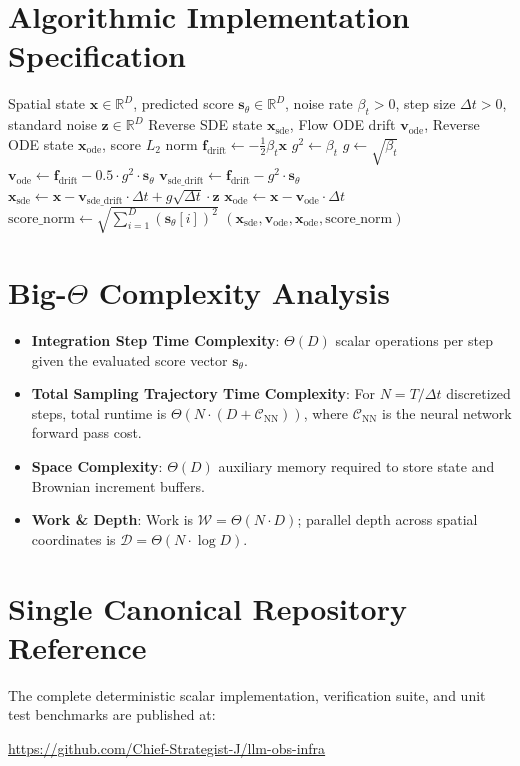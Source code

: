 \documentclass[11pt,a4paper]{article}
\theoremstyle{definition}
\begin{document}
\section{Algorithmic Implementation Specification}

\begin{algorithm}[H]
\caption{Continuous Score-Based Reverse SDE and Flow ODE Integration}
\begin{algorithmic}[1]
\Require Spatial state $\mathbf{x} \in \mathbb{R}^D$, predicted score $\mathbf{s}_\theta \in \mathbb{R}^D$, noise rate $\beta_t > 0$, step size $\Delta t > 0$, standard noise $\mathbf{z} \in \mathbb{R}^D$
\Ensure Reverse SDE state $\mathbf{x}_{\text{sde}}$, Flow ODE drift $\mathbf{v}_{\text{ode}}$, Reverse ODE state $\mathbf{x}_{\text{ode}}$, score $L_2$ norm
\State $\mathbf{f}_{\text{drift}} \gets -\frac{1}{2} \beta_t \mathbf{x}$
\State $g^2 \gets \beta_t$
\State $g \gets \sqrt{\beta_t}$
\State $\mathbf{v}_{\text{ode}} \gets \mathbf{f}_{\text{drift}} - 0.5 \cdot g^2 \cdot \mathbf{s}_\theta$
\State $\mathbf{v}_{\text{sde\_drift}} \gets \mathbf{f}_{\text{drift}} - g^2 \cdot \mathbf{s}_\theta$
\State $\mathbf{x}_{\text{sde}} \gets \mathbf{x} - \mathbf{v}_{\text{sde\_drift}} \cdot \Delta t + g \sqrt{\Delta t} \cdot \mathbf{z}$
\State $\mathbf{x}_{\text{ode}} \gets \mathbf{x} - \mathbf{v}_{\text{ode}} \cdot \Delta t$
\State $\text{score\_norm} \gets \sqrt{\sum_{i=1}^D (\mathbf{s}_\theta[i])^2}$
\State \Return $(\mathbf{x}_{\text{sde}}, \mathbf{v}_{\text{ode}}, \mathbf{x}_{\text{ode}}, \text{score\_norm})$
\end{algorithmic}
\end{algorithm}

\section{Big-$\Theta$ Complexity Analysis}

\begin{itemize}
    \item \textbf{Integration Step Time Complexity}: $\Theta(D)$ scalar operations per step given the evaluated score vector $\mathbf{s}_\theta$.
    \item \textbf{Total Sampling Trajectory Time Complexity}: For $N = T / \Delta t$ discretized steps, total runtime is $\Theta(N \cdot (D + \mathcal{C}_{\text{NN}}))$, where $\mathcal{C}_{\text{NN}}$ is the neural network forward pass cost.
    \item \textbf{Space Complexity}: $\Theta(D)$ auxiliary memory required to store state and Brownian increment buffers.
    \item \textbf{Work \& Depth}: Work is $\mathcal{W} = \Theta(N \cdot D)$; parallel depth across spatial coordinates is $\mathcal{D} = \Theta(N \cdot \log D)$.
\end{itemize}

\section{Single Canonical Repository Reference}

The complete deterministic scalar implementation, verification suite, and unit test benchmarks are published at:
\begin{center}
\url{https://github.com/Chief-Strategist-J/llm-obs-infra}
\end{center}
\end{document}
